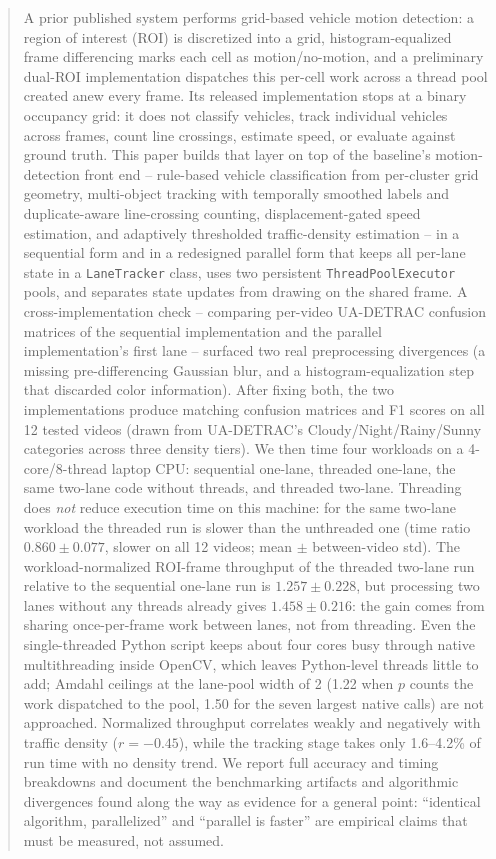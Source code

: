 \documentclass[conference]{IEEEtran}
\newcommand{\code}[1]{\texttt{#1}}
\begin{document}
\begin{abstract}
A prior published system \cite{baseline} performs grid-based vehicle
motion detection: a region of interest (ROI) is discretized into a
grid, histogram-equalized frame differencing marks each cell as
motion/no-motion, and a preliminary dual-ROI implementation dispatches
this per-cell work across a thread pool created anew every frame. Its
released implementation stops at a binary occupancy grid: it does not
classify vehicles, track individual vehicles across frames, count line
crossings, estimate speed, or evaluate against ground truth. This paper
builds that layer on top of the baseline's motion-detection front end
-- rule-based vehicle classification from per-cluster grid geometry,
multi-object tracking with temporally smoothed labels and
duplicate-aware line-crossing counting, displacement-gated speed
estimation, and adaptively thresholded traffic-density estimation --
in a sequential form and in a redesigned parallel form that keeps all
per-lane state in a \code{LaneTracker} class, uses two persistent
\code{ThreadPoolExecutor} pools, and separates state updates from drawing
on the shared frame. A cross-implementation check -- comparing per-video
UA-DETRAC confusion matrices of the sequential implementation and the
parallel implementation's first lane -- surfaced two real preprocessing
divergences (a missing pre-differencing Gaussian blur, and a
histogram-equalization step that discarded color information). After
fixing both, the two implementations produce matching confusion matrices
and F1 scores on all 12 tested videos (drawn from UA-DETRAC's
Cloudy/Night/Rainy/Sunny categories across three density tiers). We then
time four workloads on a 4-core/8-thread laptop CPU: sequential one-lane,
threaded one-lane, the same two-lane code without threads, and threaded
two-lane. Threading does \emph{not} reduce execution time on this
machine: for the same two-lane workload the threaded run is slower than
the unthreaded one (time ratio $0.860\pm0.077$, slower on all 12 videos;
mean $\pm$ between-video std). The workload-normalized ROI-frame
throughput of the threaded two-lane run relative to the sequential
one-lane run is $1.257\pm0.228$, but processing two lanes without any
threads already gives $1.458\pm0.216$: the gain comes from sharing
once-per-frame work between lanes, not from threading. Even the
single-threaded Python script keeps about four cores busy through native
multithreading inside OpenCV, which leaves Python-level threads little to
add; Amdahl ceilings at the lane-pool width of 2 (1.22 when $p$ counts
the work dispatched to the pool, 1.50 for the seven largest native calls)
are not approached. Normalized throughput correlates weakly and
negatively with traffic density ($r{=}-0.45$), while the tracking stage
takes only 1.6--4.2\% of run time with no density trend. We report full
accuracy and timing breakdowns and document the benchmarking artifacts
and algorithmic divergences found along the way as evidence for a
general point: ``identical algorithm, parallelized'' and ``parallel is
faster'' are empirical claims that must be measured, not assumed.
\end{abstract}
\end{document}
